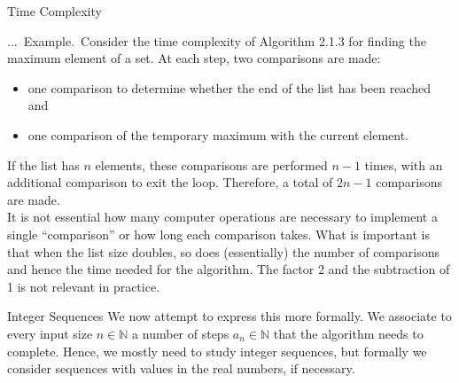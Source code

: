 \documentclass[smaller,hyperref={CJKbookmarks=true}]{beamer}
\newcommand{\N}{\mathbb{N}} \newcommand{\Z}{\mathbb{Z}} \newcommand{\Q}{\mathbb{Q}}
\newcounter{zhuo}[subsection]
\renewcommand{\thezhuo}{\thesection.\thesubsection.\arabic{zhuo}}
\newenvironment{EXAMPLE}{\stepcounter{zhuo}\alert{\!\thezhuo.~Example.\,}}{}
\begin{document}
\begin{frame}[t]{Time Complexity}
\begin{spacing}{1.05}
\begin{EXAMPLE}
Consider the time complexity of Algorithm 2.1.3 for finding the maximum element of a set. At each step, two comparisons are made:
\begin{itemize}
  \item one comparison to determine whether the end of the list has been reached and
  \item one comparison of the temporary maximum with the current element.
\end{itemize}
If the list has $n$ elements, these comparisons are performed $n-1$ times,
with an additional comparison to exit the loop. Therefore, a total of
$2n-1$ comparisons are made.\\[6pt]
It is not essential how many computer operations are necessary to
implement a single ``comparison'' or how long each comparison takes.
What is important is that when the list size doubles, so does (essentially)
the number of comparisons and hence the time needed for the algorithm.
The factor 2 and the subtraction of 1 is not relevant in practice.
\end{EXAMPLE}
\end{spacing}
\end{frame}
\begin{frame}[c]{Integer Sequences}
We now attempt to express this more formally. We associate to every
input size $n\in\N$ a number of steps $a_n\in\N$ that the algorithm needs to
complete. Hence, we mostly need to study integer sequences, but formally
we consider sequences with values in the real numbers, if necessary.
\end{frame}
\end{document}
